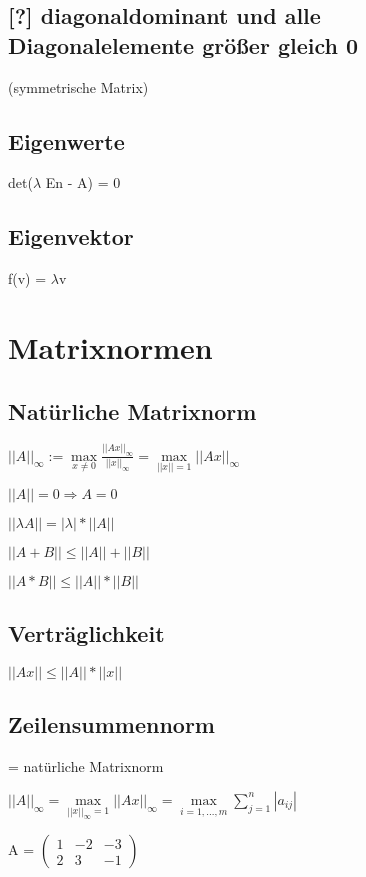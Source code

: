 \documentclass[12pt,a4paper]{article} %
\begin{document}
	\subsection{[?] diagonaldominant und alle Diagonalelemente größer gleich 0}
	(symmetrische Matrix)
	
	\subsection{Eigenwerte}
	det($\lambda$ En - A) = 0
	
	\subsection{Eigenvektor}
	f(v) = $\lambda$v
		
	\newpage
	
	\section{Matrixnormen}
	
	\subsection{Natürliche Matrixnorm}
	
	$||A||_\infty := \max\limits_{x \ne 0} \frac{||Ax||_\infty}{||x||_\infty} = \max\limits_{||x|| = 1}||Ax||_\infty$
	
	$||A|| = 0 \Rightarrow A = 0 $
	
	$||\lambda A|| = |\lambda|*||A|| $
	
	$||A+B|| \le ||A|| + ||B||$
	
	$||A*B|| \le ||A|| * ||B||$

	
	\subsection{Verträglichkeit}
	$||Ax|| \le ||A|| * ||x||$
	
	\subsection{Zeilensummennorm}
	= natürliche Matrixnorm
	
	$||A||_\infty = \max\limits_{||x||_\infty = 1} ||Ax||_\infty = \max\limits_{i = 1, ..., m} \sum\limits_{j = 1}^{n} |a_{ij}|$
	
	A = 
	$\begin{pmatrix}
		1 & -2 & -3 \\
		2 & 3 & -1
	\end{pmatrix}$
	
\end{document}
